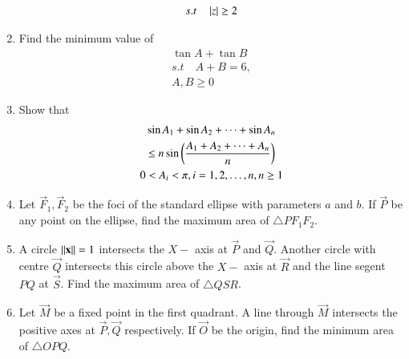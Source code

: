 \begin{enumerate}[label=\arabic*.,ref=\thesubsection.\theenumi]
\begin{align}
\\
s.t\quad \left\vert z\right\vert \ge 2
\end{align}
\item Find  the minimum value of
\begin{align}
\tan A + \tan B
\\
s.t \quad A+B=6,
\\
A, B \ge 0
\end{align}
\item Show that 
\begin{multline}
\sin A_1+\sin A_2 + \dots + \sin A_n 
\\
\le n \sin \left(\frac{A_1+A_2+\dots + A_n}{n}\right)
\\
0 < A_i < \pi, i = 1, 2, \dots , n, n \ge 1
\end{multline}
\item Let $\vec{F}_1, \vec{F}_2$ be the foci of the standard ellipse with parameters $a$ and $b$.  If $\vec{P}$ be any point on the ellipse, find the maximum area of $\triangle PF_1F_2$.
\item A circle $\left\lVert\mathbf{x}\right\rVert=1$ intersects the $X-$ axis at $\vec{P}$ and $\vec{Q}$.  Another circle with centre $\vec{Q}$ intersects this circle above the $X-$ axis at $\vec{R}$ and the line segent $PQ$ at $\vec{S}$.  Find the maximum area of $\triangle QSR$.
\item Let $\vec{M}$ be a fixed point in the first quadrant.   A line through $\vec{M}$ intersects the positive axes at $\vec{P}, \vec{Q}$ respectively. If $\vec{O}$ be the origin, find the minimum area of $\triangle OPQ$.
\end{enumerate}
